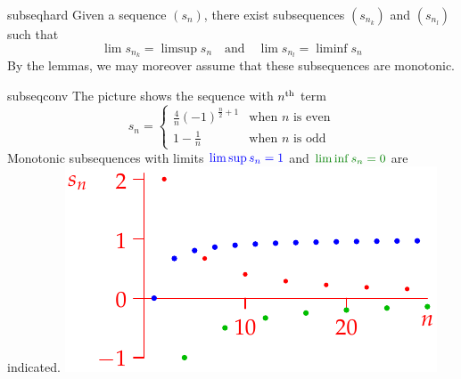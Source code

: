 \goodbreak


\begin{thm}{}{subseqhard}
	Given a sequence $(s_n)$, there exist subsequences $(s_{n_k})$ and $(s_{n_l})$ such that
	\[
		\lim s_{n_k}=\limsup s_n\quad\text{and}\quad \lim s_{n_l}=\liminf s_n
	\]
	By the lemmas, we may moreover assume that these subsequences are monotonic.
\end{thm}


\begin{example}[lower separated=false, sidebyside, sidebyside align=top seam, sidebyside gap=0pt, righthand width=0.47\linewidth]{}{subseqconv}
	The picture shows the sequence with $n\textsuperscript{th}$ term
	\[
		s_n=
		\begin{cases}
			\frac 4n(-1)^{\frac n2+1}&\text{when $n$ is even}\\
			1-\frac 1{n}&\text{when $n$ is odd}
		\end{cases}
	\]
	Monotonic subsequences with limits $\textcolor{blue}{\limsup s_n=1}$ and $\textcolor{Green}{\liminf s_n=0}$ are indicated.
	\tcblower
	\hfill\includegraphics[scale=0.95]{exlimsupconv2}
\end{example}


